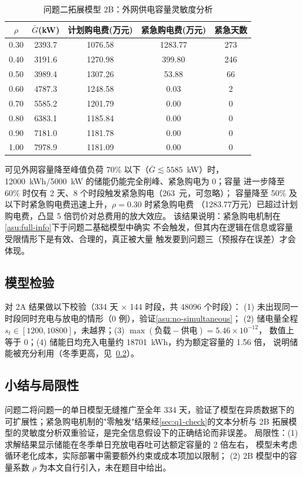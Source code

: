 \documentclass[withoutpreface,bwprint]{cumcmthesis}
\begin{document}
\begin{table}[!htbp]
\caption{问题二拓展模型 2B：外网供电容量灵敏度分析}\label{tab:q2-sens}\centering
\begin{tabular}{ccccc}
\toprule[1.5pt]
$\rho$ & $\bar G$(kW) & 计划购电费(万元) & 紧急购电费(万元) & 紧急天数\\
\midrule[1pt]
0.30 & 2393.7 & 1076.58 & 1283.77 & 273\\
0.40 & 3191.6 & 1270.98 & 399.80  & 246\\
0.50 & 3989.4 & 1307.26 & 53.88   & 66\\
0.60 & 4787.3 & 1248.58 & 0.03    & 2\\
0.70 & 5585.2 & 1201.79 & 0.00    & 0\\
0.80 & 6383.1 & 1185.84 & 0.00    & 0\\
0.90 & 7181.0 & 1181.78 & 0.00    & 0\\
1.00 & 7978.9 & 1181.09 & 0.00    & 0\\
\bottomrule[1.5pt]
\end{tabular}
\end{table}

可见外网容量降至峰值负荷 70\% 以下（$\bar G\lesssim5585$~kW）时，
\num{12000}~kWh/\num{5000}~kW 的储能仍能完全削峰、紧急购电为 0；容量
进一步降至 60\% 时仅有 2 天、8 个时段触发紧急购电（\num{263}~元，可忽略）；
容量降至 50\% 及以下时紧急购电费迅速上升，$\rho=0.30$ 时紧急购电费
（\num{1283.77}万元）已超过计划购电费，凸显 5 倍罚价对总费用的放大效应。
该结果说明：紧急购电机制在\cref{asu:full-info}下于问题二基础模型中确实
不会触发，但其内在逻辑在信息或容量受限情形下是有效、合理的，真正被大量
触发要到问题三（预报存在误差）才会体现。

\subsection{模型检验}\label{sec:q2-check}
对 2A 结果做以下校验（334 天 $\times$ 144 时段，共 \num{48096} 个时段）：
(1) 未出现同一时段同时充电与放电的情形（0 例），验证\cref{asu:no-simultaneous}；
(2) 储电量全程 $s_t\in[1200,10800]$，未越界；(3) $\max(\text{负载}-\text{供电})=5.46\times10^{-12}$，
数值上等于 0；(4) 储能日均充入电量约 \num{18701}~kWh，约为额定容量的 1.56 倍，
说明储能被充分利用（冬季更高，见~\cref{sec:q2-limitation}）。

\subsection{小结与局限性}\label{sec:q2-limitation}
问题二将问题一的单日模型无缝推广至全年 334 天，验证了模型在异质数据下的
可扩展性；紧急购电机制的"零触发"结果经\cref{sec:q1-check}的文本分析与
2B 拓展模型的灵敏度分析双重验证，是完全信息假设下的正确结论而非误差。
局限性：(1) 求解结果显示储能在冬季单日充放电吞吐可达额定容量的 2 倍左右，
模型未考虑循环老化成本，实际部署中需要额外约束或成本项加以限制；
(2) 2B 模型中的容量系数 $\rho$ 为本文自行引入，未在题目中给出。
\end{document}

